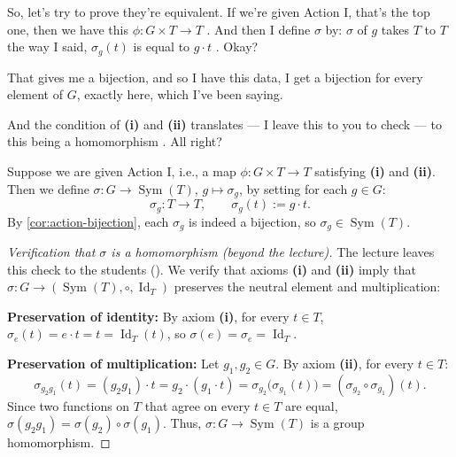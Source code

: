 \begin{proofWrapper}

\begin{speech}[01:08:57 - 01:09:54]
So, let's try to prove they're equivalent. If we're given Action I, that's the top one, then we have this $\phi \colon G \times T \to T$ . And then I define $\sigma$ by: $\sigma$ of $g$ takes $T$ to $T$ the way I said, $\sigma_g(t)$ is equal to $g \cdot t$ . Okay?

That gives me a bijection, and so I have this data, I get a bijection for every element of $G$, exactly here, which I've been saying.

And the condition of \textbf{(i)} and \textbf{(ii)} translates --- I leave this to you to check --- to this being a homomorphism . All right?
\end{speech}

\begin{content}
Suppose we are given Action I, i.e., a map $\phi \colon G \times T \to T$ satisfying \textbf{(i)} and \textbf{(ii)}. Then we define $\sigma \colon G \to \operatorname{Sym}(T)$, $g \mapsto \sigma_g$, by setting for each $g \in G$:
\[
\sigma_g \colon T \longrightarrow T, \qquad \sigma_g(t) := g \cdot t.
\]
By \cref{cor:action-bijection}, each $\sigma_g$ is indeed a bijection, so $\sigma_g \in \operatorname{Sym}(T)$.

\begin{proof}[Verification that \texorpdfstring{$\sigma$}{sigma} is a homomorphism (beyond the lecture)]
The lecture leaves this check to the students (). We verify that axioms \textbf{(i)} and \textbf{(ii)} imply that $\sigma \colon G \to (\operatorname{Sym}(T), \circ, \operatorname{Id}_T)$ preserves the neutral element and multiplication:

\textbf{Preservation of identity:} By axiom \textbf{(i)}, for every $t \in T$, $\sigma_e(t) = e \cdot t = t = \operatorname{Id}_T(t)$, so $\sigma(e) = \sigma_e = \operatorname{Id}_T$.

\textbf{Preservation of multiplication:} Let $g_1, g_2 \in G$. By axiom \textbf{(ii)}, for every $t \in T$:
\[
\sigma_{g_2 g_1}(t) = (g_2 g_1) \cdot t = g_2 \cdot (g_1 \cdot t) = \sigma_{g_2}\bigl(\sigma_{g_1}(t)\bigr) = (\sigma_{g_2} \circ \sigma_{g_1})(t).
\]
Since two functions on $T$ that agree on every $t \in T$ are equal, $\sigma(g_2 g_1) = \sigma(g_2) \circ \sigma(g_1)$. Thus, $\sigma \colon G \to \operatorname{Sym}(T)$ is a group homomorphism.
\end{proof}
\end{content}


\end{proofWrapper}
